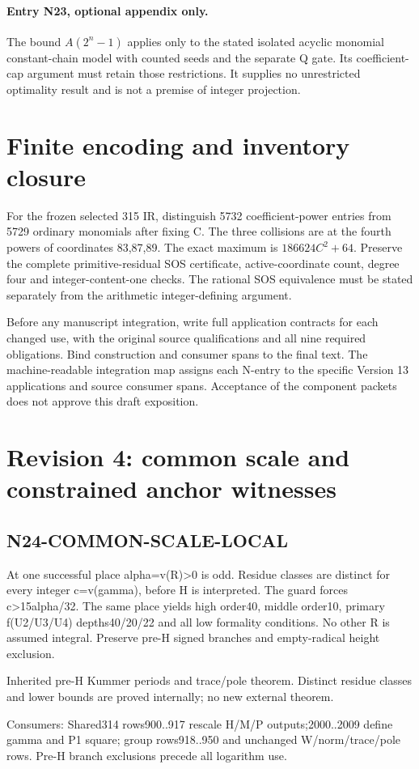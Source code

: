 \documentclass{article}
\begin{document}
\paragraph{Entry N23, optional appendix only.}
The bound $A(2^n-1)$ applies only to the stated isolated acyclic monomial
constant-chain model with counted seeds and the separate Q gate. Its
coefficient-cap argument must retain those restrictions. It supplies no
unrestricted optimality result and is not a premise of integer projection.

\section{Finite encoding and inventory closure}
\label{outline:finite}
For the frozen selected 315 IR, distinguish 5732 coefficient-power entries
from 5729 ordinary monomials after fixing C. The three collisions are
at the fourth powers of coordinates 83,87,89. The exact maximum is
$186624C^2+64$. Preserve the complete primitive-residual SOS certificate,
active-coordinate count, degree four and integer-content-one checks.
The rational SOS equivalence must be stated separately from the arithmetic
integer-defining argument.

Before any manuscript integration, write full application contracts for
each changed use, with the original source qualifications and all nine
required obligations. Bind construction and consumer spans to the final
text. The machine-readable integration map assigns each N-entry to the
specific Version 13 applications and source consumer spans. Acceptance
of the component packets does not approve this draft exposition.
\section{Revision 4: common scale and constrained anchor witnesses}
\subsection{N24-COMMON-SCALE-LOCAL}
\label{outline:r4-n24-common-scale-local}
At one successful place alpha=v(R)>0 is odd. Residue classes are distinct for every integer c=v(gamma), before H is interpreted. The guard forces c>15alpha/32. The same place yields high order40, middle order10, primary f(U2/U3/U4) depths40/20/22 and all low formality conditions. No other R is assumed integral. Preserve pre-H signed branches and empty-radical height exclusion.
\par Inherited pre-H Kummer periods and trace/pole theorem. Distinct residue classes and lower bounds are proved internally; no new external theorem.
\par Consumers: Shared314 rows900..917 rescale H/M/P outputs;2000..2009 define gamma and P1 square; group rows918..950 and unchanged W/norm/trace/pole rows. Pre-H branch exclusions precede all logarithm use.
\end{document}
